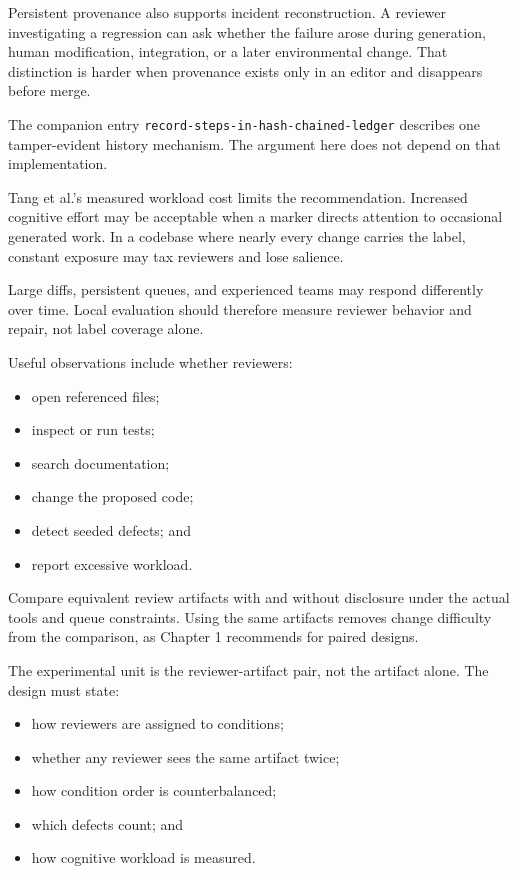 Persistent provenance also supports incident reconstruction. A reviewer investigating a regression can ask whether the failure arose during generation, human modification, integration, or a later environmental change. That distinction is harder when provenance exists only in an editor and disappears before merge.

The companion entry \texttt{record-steps-in-hash-chained-ledger} describes one tamper-evident history mechanism. The argument here does not depend on that implementation.

Tang et al.'s measured workload cost limits the recommendation. Increased cognitive effort may be acceptable when a marker directs attention to occasional generated work. In a codebase where nearly every change carries the label, constant exposure may tax reviewers and lose salience.

Large diffs, persistent queues, and experienced teams may respond differently over time. Local evaluation should therefore measure reviewer behavior and repair, not label coverage alone.


Useful observations include whether reviewers:

\begin{itemize}
\tightlist
\item
  open referenced files;
\item
  inspect or run tests;
\item
  search documentation;
\item
  change the proposed code;
\item
  detect seeded defects; and
\item
  report excessive workload.
\end{itemize}

Compare equivalent review artifacts with and without disclosure under the actual tools and queue constraints. Using the same artifacts removes change difficulty from the comparison, as Chapter 1 recommends for paired designs.


The experimental unit is the reviewer-artifact pair, not the artifact alone. The design must state:

\begin{itemize}
\tightlist
\item
  how reviewers are assigned to conditions;
\item
  whether any reviewer sees the same artifact twice;
\item
  how condition order is counterbalanced;
\item
  which defects count; and
\item
  how cognitive workload is measured.
\end{itemize}

